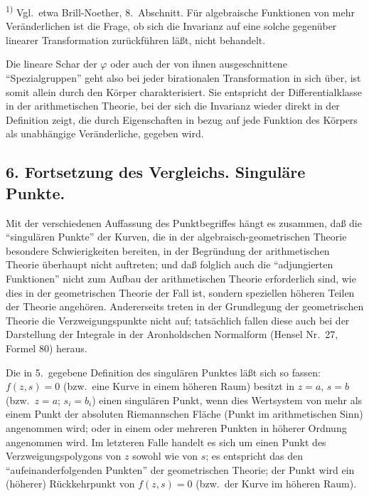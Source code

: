 \documentclass[12pt,a4paper]{article}
\begin{document}
\smallskip
\noindent\textsuperscript{1)} Vgl.\ etwa Brill-Noether, 8.\ Abschnitt. F\"ur algebraische Funktionen von mehr Ver\"anderlichen ist die Frage, ob sich die Invarianz auf eine solche gegen\"uber linearer Transformation zur\"uckf\"uhren l\"a\ss{}t, nicht behandelt.

Die lineare Schar der $\varphi$ oder auch der von ihnen ausgeschnittene ``Spezialgruppen'' geht also bei jeder birationalen Transformation in sich \"uber, ist somit allein durch den K\"orper charakterisiert. Sie entspricht der Differentialklasse in der arithmetischen Theorie, bei der sich die Invarianz wieder direkt in der Definition zeigt, die durch Eigenschaften in bezug auf jede Funktion des K\"orpers als unabh\"angige Ver\"anderliche, gegeben wird.

\subsection*{6. Fortsetzung des Vergleichs. Singul\"are Punkte.}

Mit der verschiedenen Auffassung des Punktbegriffes h\"angt es zusammen, da\ss{} die ``singul\"aren Punkte'' der Kurven, die in der algebraisch-geometrischen Theorie besondere Schwierigkeiten bereiten, in der Begr\"undung der arithmetischen Theorie \"uberhaupt nicht auftreten; und da\ss{} folglich auch die ``adjungierten Funktionen'' nicht zum Aufbau der arithmetischen Theorie erforderlich sind, wie dies in der geometrischen Theorie der Fall ist, sondern speziellen h\"oheren Teilen der Theorie angeh\"oren. Andererseits treten in der Grundlegung der geometrischen Theorie die Verzweigungspunkte nicht auf; tats\"achlich fallen diese auch bei der Darstellung der Integrale in der Aronholdschen Normalform (Hensel Nr.\ 27, Formel 80) heraus.

Die in 5.\ gegebene Definition des singul\"aren Punktes l\"a\ss{}t sich so fassen: $f(z,s)=0$ (bzw.\ eine Kurve in einem h\"oheren Raum) besitzt in $z=a$, $s=b$ (bzw.\ $z=a$; $s_{i}=b_{i}$) einen singul\"aren Punkt, wenn dies Wertsystem von mehr als einem Punkt der absoluten Riemannschen Fl\"ache (Punkt im arithmetischen Sinn) angenommen wird; oder in einem oder mehreren Punkten in h\"oherer Ordnung angenommen wird. Im letzteren Falle handelt es sich um einen Punkt des Verzweigungspolygons von $z$ sowohl wie von $s$; es entspricht das den ``aufeinanderfolgenden Punkten'' der geometrischen Theorie; der Punkt wird ein (h\"oherer) R\"uckkehrpunkt von $f(z,s)=0$ (bzw.\ der Kurve im h\"oheren Raum).
\end{document}
